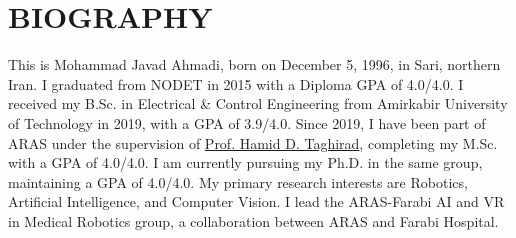 \documentclass[11pt,a4paper,sans]{moderncv} %
\begin{document}
	
	\makecvtitle
	
\section{BIOGRAPHY}
    This is Mohammad Javad Ahmadi, born on December 5, 1996, in Sari, northern Iran. I graduated from NODET in 2015 with a Diploma GPA of 4.0/4.0. I received my B.Sc. in Electrical \& Control Engineering from Amirkabir University of Technology in 2019, with a GPA of 3.9/4.0. Since 2019, I have been part of ARAS under the supervision of \href{https://aras.kntu.ac.ir/taghirad/}{Prof. Hamid D. Taghirad}, completing my M.Sc. with a GPA of 4.0/4.0. I am currently pursuing my Ph.D. in the same group, maintaining a GPA of 4.0/4.0. My primary research interests are Robotics, Artificial Intelligence, and Computer Vision. I lead the ARAS-Farabi AI and VR in Medical Robotics group, a collaboration between ARAS and Farabi Hospital.
    
\end{document}
